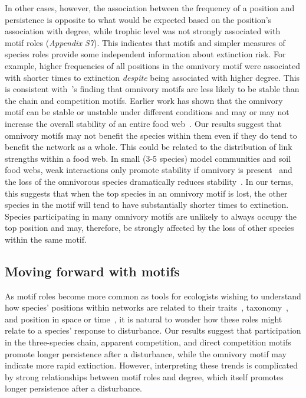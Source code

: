 \documentclass[12pt]{article}
\begin{document}
\begin{spacing}{2.0}
        
        In other cases, however, the association between the frequency of a position and persistence is opposite to what would be expected based on the position's association with degree, while trophic level was not strongly associated with motif roles (\emph{Appendix S7}).
        This indicates that motifs and simpler measures of species roles provide some independent information about extinction risk.
        For example, higher frequencies of all positions in the omnivory motif were associated with shorter times to extinction \emph{despite} being associated with higher degree.
        This is consistent with~\citet{Borrelli2015a}'s finding that omnivory motifs are less likely to be stable than the chain and competition motifs.
        Earlier work has shown that the omnivory motif can be stable or unstable under different conditions and may or may not increase the overall stability of an entire food web~\citep{McCann1997,Emmerson2004,Borrelli2015a,Monteiro2016}.
        Our results suggest that omnivory motifs may not benefit the species within them even if they do tend to benefit the network as a whole.
        This could be related to the distribution of link strengths within a food web.
        In small (3-5 species) model communities and soil food webs, weak interactions only promote stability if omnivory is present~\citep{Neutel2002,Emmerson2004} and the loss of the omnivorous species dramatically reduces stability~\citep{Emmerson2004}.
        In our terms, this suggests that when the top species in an omnivory motif is lost, the other species in the motif will tend to have substantially shorter times to extinction.
        Species participating in many omnivory motifs are unlikely to always occupy the top position and may, therefore, be strongly affected by the loss of other species within the same motif.
        

	\subsection*{Moving forward with motifs}	

        As motif roles become more common as tools for ecologists wishing to understand how species' positions within networks are related to their traits~\citep{Cirtwill2018EcolLett}, taxonomy~\citep{Stouffer2007}, and position in space or time~\citep{Baker2015}, it is natural to wonder how these roles might relate to a species' response to disturbance. 
        Our results suggest that participation in the three-species chain, apparent competition, and direct competition motifs promote longer persistence after a disturbance, while the omnivory motif may indicate more rapid extinction.
        However, interpreting these trends is complicated by strong relationships between motif roles and degree, which itself promotes longer persistence after a disturbance.
        

\end{spacing}
\end{document}
